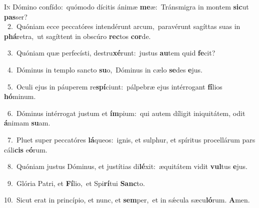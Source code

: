\lettrine{\initial\textcolor{\initialcolor}{I}}{n} Dómino confído:~\dagger quómodo dícitis ánimæ \textbf{me}\-æ:~\star Tránsmigra in montem \textbf{sic}\-ut \textbf{pas}\-ser?\\
{\numbfont\textcolor{\numbcolor}{~2.}}~Quóniam ecce peccatóres intendérunt arcum,~\dagger paravérunt sagíttas suas in \textbf{phá}\-retra,~\star ut sagíttent in obscúro \textbf{rec}\-tos \textbf{cor}\-de.\par
{\numbfont\textcolor{\numbcolor}{~3.}}~Quóniam quæ perfecísti, destru\-\textbf{xé}\-runt:~\star justus \textbf{au}\-tem quid \textbf{fe}\-cit?\par
{\numbfont\textcolor{\numbcolor}{~4.}}~Dóminus in templo sancto \textbf{su}\-o,~\star Dóminus in cælo \textbf{se}\-des \textbf{e}\-jus.\par
{\numbfont\textcolor{\numbcolor}{~5.}}~Oculi ejus in páuperem re\-\textbf{spí}\-ciunt:~\star pálpebræ ejus intérrogant \textbf{fí}\-lios \textbf{hó}\-minum.\par
{\numbfont\textcolor{\numbcolor}{~6.}}~Dóminus intérrogat justum et \textbf{ím}\-pium:~\star qui autem díligit iniquitátem, odit \textbf{á}\-nimam \textbf{su}\-am.\par
{\numbfont\textcolor{\numbcolor}{~7.}}~Pluet super peccatóres \textbf{lá}\-queos:~\star ignis, et sulphur, et spíritus procellárum pars cáli\textbf{cis} e\-\textbf{ó}\-rum.\par
{\numbfont\textcolor{\numbcolor}{~8.}}~Quóniam justus Dóminus, et justítias di\-\textbf{lé}\-xit:~\star æquitátem vidit \textbf{vul}\-tus \textbf{e}\-jus.\par
{\numbfont\textcolor{\numbcolor}{~9.}}~Glória Patri, et \textbf{Fí}\-lio,~\star et Spi\-\textbf{rí}\-tui \textbf{Sanc}\-to.\par
{\numbfont\textcolor{\numbcolor}{10.}}~Sicut erat in princípio, et nunc, et \textbf{sem}\-per,~\star et in sǽcula sæcu\-\textbf{ló}\-rum. \textbf{A}\-men.\par
